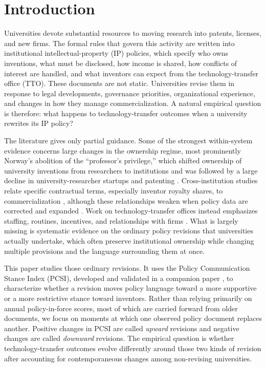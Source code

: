 \section{Introduction}

Universities devote substantial resources to moving research into patents, licenses, and new firms. The formal rules that govern this activity are written into institutional intellectual-property (IP) policies, which specify who owns inventions, what must be disclosed, how income is shared, how conflicts of interest are handled, and what inventors can expect from the technology-transfer office (TTO). These documents are not static. Universities revise them in response to legal developments, governance priorities, organizational experience, and changes in how they manage commercialization. A natural empirical question is therefore: what happens to technology-transfer outcomes when a university rewrites its IP policy?

The literature gives only partial guidance. Some of the strongest within-system evidence concerns large changes in the ownership regime, most prominently Norway's abolition of the ``professor's privilege,'' which shifted ownership of university inventions from researchers to institutions and was followed by a large decline in university-researcher startups and patenting \citep{HvideJones2018}. Cross-institution studies relate specific contractual terms, especially inventor royalty shares, to commercialization \citep{LachSchankerman2008,ArqueCastellsEtAl2016}, although these relationships weaken when policy data are corrected and expanded \citep{OuelletteTutt2020}. Work on technology-transfer offices instead emphasizes staffing, routines, incentives, and relationships with firms \citep{SiegelWaldmanLink2003,MarkmanEtAl2005,DebackereVeugelers2005}. What is largely missing is systematic evidence on the ordinary policy revisions that universities actually undertake, which often preserve institutional ownership while changing multiple provisions and the language surrounding them at once.

This paper studies those ordinary revisions. It uses the Policy Communication Stance Index (PCSI), developed and validated in a companion paper \citep{SharmaPCSI2026}, to characterize whether a revision moves policy language toward a more supportive or a more restrictive stance toward inventors. Rather than relying primarily on annual policy-in-force scores, most of which are carried forward from older documents, we focus on moments at which one observed policy document replaces another. Positive changes in PCSI are called \emph{upward} revisions and negative changes are called \emph{downward} revisions. The empirical question is whether technology-transfer outcomes evolve differently around those two kinds of revision after accounting for contemporaneous changes among non-revising universities.

